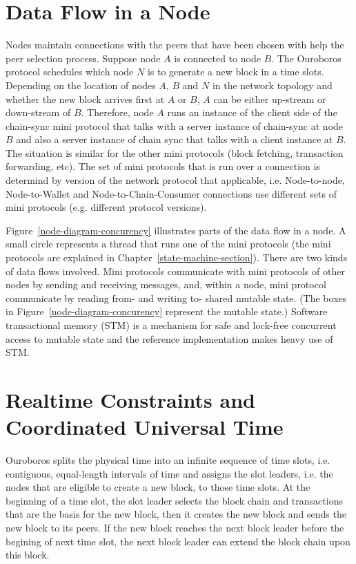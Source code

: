 \documentclass{report}
\theoremstyle{definition}{
  \newtheorem{lemma}{Lemma}[section] %
  \newtheorem{definition}[lemma]{Definition}
}
\theoremstyle{theorem}{
  \newtheorem{invariant}[lemma]{Invariant}
  \newtheorem{proofobligation}[lemma]{Proof Obligation}
}
\numberwithin{equation}{lemma}
\begin{document}
\section{Data Flow in a Node}
Nodes maintain connections with the peers that have been chosen with help the peer selection process.
Suppose node $A$ is connected to node $B$.
The Ouroboros protocol schedules which node $N$ is to generate a new block in a time slots.
Depending on the location of nodes $A$, $B$ and $N$ in the network topology and whether the new
block arrives first at $A$ or $B$, $A$ can be either up-stream or down-stream of $B$.
Therefore, node $A$ runs an instance of the client side of the chain-sync mini protocol
that talks with a server instance of chain-sync at node $B$ and also a server instance of chain sync
that talks with a client instance at $B$.
The situation is similar for the other mini protocols (block fetching, transaction forwarding, etc).
The set of mini protocols that is run over a connection is determind by version of the network
protocol that applicable, i.e.
Node-to-node, Node-to-Wallet and Node-to-Chain-Consumer connections use different sets of mini protocols
(e.g. different protocol versions).

Figure~\ref{node-diagram-concurency} illustrates parts of the data flow in a node.
A small circle represents a thread that runs one of the mini protocols (the mini protocols are explained in
Chapter~\ref{state-machine-section}).
There are two kinds of data flows involved.
Mini protocols communicate with mini protocols of other nodes by sending and receiving messages,
and, within a node, mini protocol communicate by reading from- and writing to- shared mutable state.
(The boxes in Figure~\ref{node-diagram-concurency} represent the mutable state.)
Software transactional memory (STM) is a mechanism for safe and lock-free concurrent
access to mutable state and the reference implementation makes heavy use of STM.

\section{Realtime Constraints and Coordinated Universal Time}
Ouroboros splits the physical time into an infinite sequence of time slots,
i.e. contiguous, equal-length intervals of time
and assigns the slot leaders, i.e. the nodes that are eligible to create a new block, to those time slots.
At the beginning of a time slot, the slot leader selects the block chain and transactions that are the basis
for the new block, then it creates the new block and sends the new block to its peers.
If the new block reaches the next block leader before the begining of next time slot,
the next block leader can extend the block chain upon this block.
\end{document}

